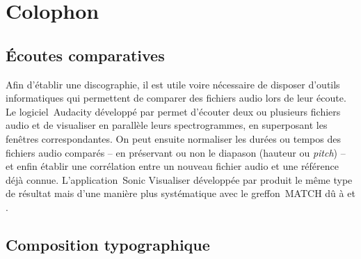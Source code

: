 \chapter[%
Colophon][%
Colophon]{%
Colophon}
\label{chap:Colophon}

\section{Écoutes comparatives}

Afin d'établir une discographie, il est utile voire nécessaire de disposer
d'outils informatiques qui permettent de comparer des fichiers audio lors de
leur écoute.
Le logiciel~Audacity développé par \citet{Audacity} permet d'écouter deux ou
plusieurs fichiers audio et de visualiser en parallèle leurs spectrogrammes,
en superposant les fenêtres correspondantes.
On peut ensuite normaliser les durées ou tempos des fichiers audio comparés
-- en préservant ou non le diapason (hauteur ou \emph{pitch}) -- et enfin
établir une corrélation entre un nouveau fichier audio et une référence déjà
connue.
L'application~Sonic Visualiser développée par \citet{Cannam} produit le même
type de résultat mais d'une manière plus systématique avec le greffon~MATCH
dû à \citet{Dixon05a} et \citet{Dixon05b}.

\section{Composition typographique}

